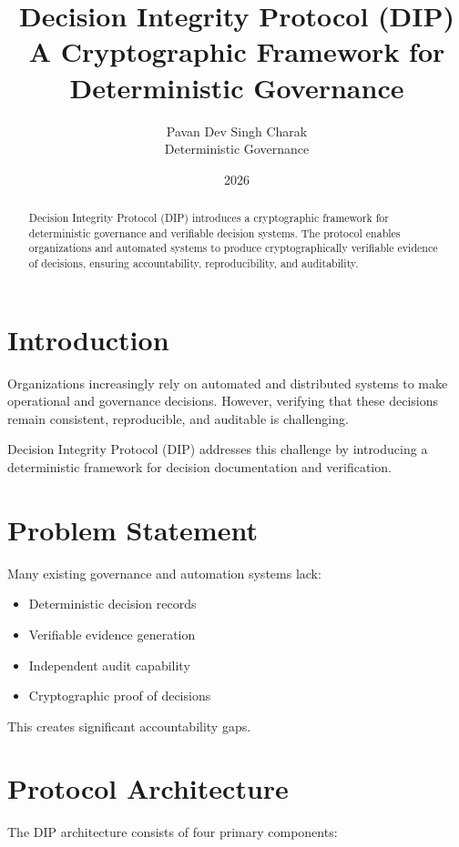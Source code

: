 \documentclass[11pt]{article}
\title{
\Huge Decision Integrity Protocol (DIP) \\
\vspace{0.5em}
\Large A Cryptographic Framework for Deterministic Governance
}
\author{
Pavan Dev Singh Charak \\
Deterministic Governance
}
\date{2026}
\begin{document}
\maketitle

\begin{abstract}
Decision Integrity Protocol (DIP) introduces a cryptographic framework
for deterministic governance and verifiable decision systems.
The protocol enables organizations and automated systems to produce
cryptographically verifiable evidence of decisions, ensuring
accountability, reproducibility, and auditability.
\end{abstract}

\tableofcontents
\newpage

\section{Introduction}

Organizations increasingly rely on automated and distributed systems
to make operational and governance decisions. However, verifying that
these decisions remain consistent, reproducible, and auditable is
challenging.

Decision Integrity Protocol (DIP) addresses this challenge by
introducing a deterministic framework for decision documentation and
verification.

\section{Problem Statement}

Many existing governance and automation systems lack:

\begin{itemize}
\item Deterministic decision records
\item Verifiable evidence generation
\item Independent audit capability
\item Cryptographic proof of decisions
\end{itemize}

This creates significant accountability gaps.

\section{Protocol Architecture}

The DIP architecture consists of four primary components:
\end{document}
